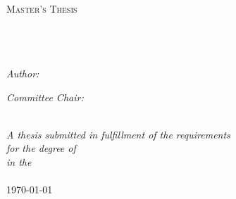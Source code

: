 \documentclass[
11pt, %
english, %
singlespacing, %
headsepline, %
]{MastersDoctoralThesis} %
\author{John \textsc{McCormack}} %
\begin{document}
\frontmatter %

\pagestyle{plain} %


\begin{titlepage}
\begin{center}

\textsc{\LARGE \univname}\\[1.5cm] %
\textsc{\Large Master's Thesis}\\[0.5cm] %

\HRule \\[0.4cm] %
{\huge \bfseries \ttitle}\\[0.4cm] %
\HRule \\[1.5cm] %
 
\begin{minipage}{0.4\textwidth}
\begin{flushleft} \large
\emph{Author:}\\
\href{http://www.jdmccormack.com}{\authorname} %
\end{flushleft}
\end{minipage}
\begin{minipage}{0.4\textwidth}
\begin{flushright} \large
\emph{Committee Chair:} \\
\href{https://floridapolytechnic.org/staff/integlia/}{\supname} %
\end{flushright}
\end{minipage}\\[3cm]
 
\large \textit{A thesis submitted in fulfillment of the requirements\\ for the degree of \degreename}\\[0.3cm] %
\textit{in the}\\[0.4cm]
\deptname\\[2cm] %
 
{\large \today}\\[4cm] %
 
\vfill
\end{center}
\end{titlepage}
\end{document}
